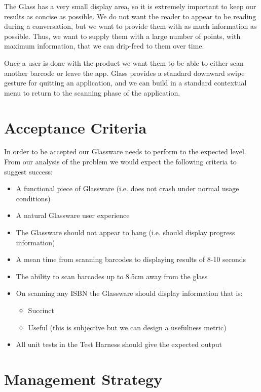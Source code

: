 \documentclass[12pt,a4paper]{report}
\begin{document}
The Glass has a very small display area, so it is extremely important to keep our results as concise as possible. We do not want the reader to appear to be reading during a conversation, but we want to provide them with as much information as possible. Thus, we want to supply them with a large number of points, with maximum information, that we can drip-feed to them over time.

Once a user is done with the product we want them to be able to either scan another barcode or leave the app. Glass provides a standard downward swipe gesture for quitting an application, and we can build in a standard contextual menu to return to the scanning phase of the application.

\chapter{Acceptance Criteria}

In order to be accepted our Glassware needs to perform to the expected level. From our analysis of the problem we would expect the following criteria to suggest success:

\begin{itemize}
	\item A functional piece of Glassware (i.e. does not crash under normal usage conditions)
	\item A natural Glassware user experience
	\item The Glassware should not appear to hang (i.e. should display progress information)
	\item A mean time from scanning barcodes to displaying results of 8-10 seconds
	\item The ability to scan barcodes up to 8.5cm away from the glass
	\item On scanning any ISBN the Glassware should display information that is:
	\begin{itemize}
		\item Succinct
		\item Useful (this is subjective but we can design a usefulness metric)
	\end{itemize}
	\item All unit tests in the Test Harness should give the expected output
\end{itemize}

\chapter{Management Strategy}
\end{document}
